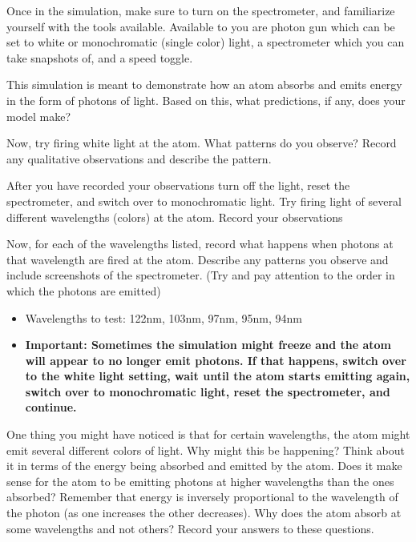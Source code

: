 \begin{steps} 
	\item Once in the simulation, make sure to turn on the spectrometer, and familiarize yourself with the tools available. Available to you are photon gun which can be set to white or monochromatic (single color) light, a spectrometer which you can take snapshots of, and a speed toggle.
	
	\item This simulation is meant to demonstrate how an atom absorbs and emits energy in the form of photons of light. Based on this, what predictions, if any, does your model make? 
	
	\item Now, try firing white light at the atom. What patterns do you observe? Record any qualitative observations and describe the pattern. 
	
	\item After you have recorded your observations turn off the light, reset the spectrometer, and switch over to monochromatic light. Try firing light of several different wavelengths (colors) at the atom. Record your observations
	
	\item Now, for each of the wavelengths listed, record what happens when photons at that wavelength are fired at the atom. Describe any patterns you observe and include screenshots of the spectrometer. (Try and pay attention to the order in which the photons are emitted)
	\begin{itemize}
		\item Wavelengths to test: 122nm, 103nm, 97nm, 95nm, 94nm 
		
		\item \textbf{Important: Sometimes the simulation might freeze and the atom will appear to no longer emit photons. If that happens, switch over to the white light setting, wait until the atom starts emitting again, switch over to monochromatic light, reset the spectrometer, and continue.}
	\end{itemize}
	
	\item One thing you might have noticed is that for certain wavelengths, the atom might emit several different colors of light. Why might this be happening? Think about it in terms of the energy being absorbed and emitted by the atom. Does it make sense for the atom to be emitting photons at higher wavelengths than the ones absorbed? Remember that energy is inversely proportional to the wavelength of the photon (as one increases the other decreases). Why does the atom absorb at some wavelengths and not others? Record your answers to these questions. 
	

\end{steps}
